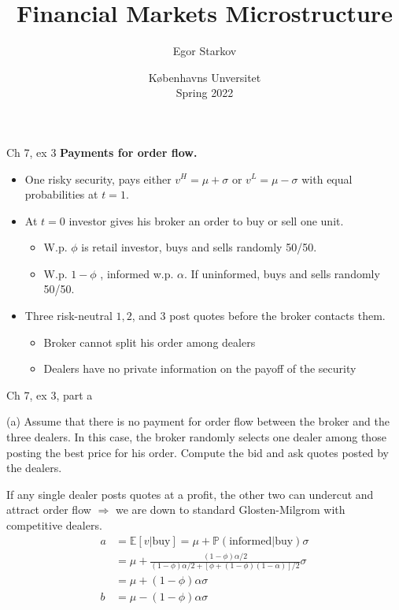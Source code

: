 \documentclass[english,10pt
,aspectratio=169
]{beamer}
\title{Financial Markets Microstructure}
\author{Egor Starkov}
\date{K{\o}benhavns Unversitet \\
	Spring 2022}
\begin{document}
	
\addtocounter{framenumber}{-1}

\begin{frame}{Ch 7, ex 3}
	\textbf{Payments for order flow. }
	\begin{itemize}
		\item One risky security, pays either $v^{H}=\mu +\sigma $ or $v^{L}=\mu -\sigma $ with equal probabilities at $t=1$.
		\item At $t=0$ investor gives his broker an order to buy or sell one unit.
		\begin{itemize}
			\item W.p. $\phi$  is retail investor, buys and sells randomly 50/50.
			\item W.p. $1-\phi$ , \alert{informed} w.p. $\alpha$. If uninformed, buys and sells randomly 50/50.
		\end{itemize}
		\item Three risk-neutral  $1,2$, and $3$ post quotes before the broker contacts them.
		\begin{itemize}
			\item Broker cannot split his order among dealers
			\item Dealers have no private information on the payoff of the security
		\end{itemize}
	\end{itemize}
\end{frame}


\begin{frame}{Ch 7, ex 3, part a}
	\begin{exampleblock}{}
		(a) Assume that there is no payment for order flow between the
		broker and the three dealers. In this case, the broker randomly selects one
		dealer among those posting the best price for his order. Compute the bid and
		ask quotes posted by the dealers.
	\end{exampleblock}
	
	\pause
	
	If any single dealer posts quotes at a profit, the other two can undercut and attract order flow $\Rightarrow$ we are down to standard Glosten-Milgrom with competitive dealers.
	\begin{align*}
		a &= \mathbb{E}[v|\text{buy}] = \mu + \mathbb{P}(\text{informed}|\text{buy}) \sigma
		\\
		&= \mu + \frac{(1-\phi)\alpha/2}{(1-\phi)\alpha/2 + \left[\phi+(1-\phi)(1-\alpha) \right]/2} \sigma
		\\
		&= \mu + (1-\phi)\alpha \sigma
		\\
		b &= \mu - (1-\phi)\alpha \sigma
	\end{align*}
\end{frame}
\end{document}

